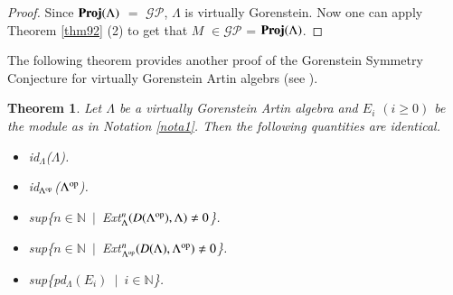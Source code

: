 \documentclass[11pt,a4paper]{article}
\newtheorem{thm}{Theorem}[section]
\begin{document}
  \begin{proof} Since  ${\bf Proj}(\Lambda)$ $=$  $\mathscr{GP}$,
  $\Lambda$ is  virtually Gorenstein.   Now  one can apply Theorem \ref{thm92} (2) to get that $M$ $\in \mathscr{GP}$ = $ {\bf Proj}(\Lambda)$.\end{proof}


 The following theorem provides
another proof of the Gorenstein Symmetry Conjecture for virtually Gorenstein Artin algebrs (see \cite[Theorem  11.4]{bel}).

\begin{thm}\label{thm102}  Let  $\Lambda$ be a virtually Gorenstein Artin algebra and  $ E_{i} $  $(i \geq 0)$ be the module as in  {\rm Notation \ref{nota1}}. Then the following quantities are identical.
\begin{itemize}
\item[$(1)$]  {\rm id$_{\Lambda}$($\Lambda$)}.
 \item[$(2)$] {\rm id$_{\Lambda^{{\rm op}}}$($\Lambda^{{\rm op}}$)}.
 \item[$(3)$]  {\rm sup\{$n \in \mathbb{N}$\ $|$\   Ext$_{\Lambda}^{n}(D(\Lambda^{{\rm op}}), \Lambda) \neq  0$\}}.
 \item[$(4)$]  {\rm sup\{$n \in \mathbb{N}$\ $|$\   Ext$_{\Lambda^{{\rm op}}}^{n}(D(\Lambda), \Lambda^{{\rm op}}) \neq  0$\}}.
  \item[$(5)$]  {\rm sup\{pd$_{\Lambda}$$(E_{i})$\ $|$\ $i \in \mathbb{N}$\}}.\end{itemize}\end{thm}
\end{document}
